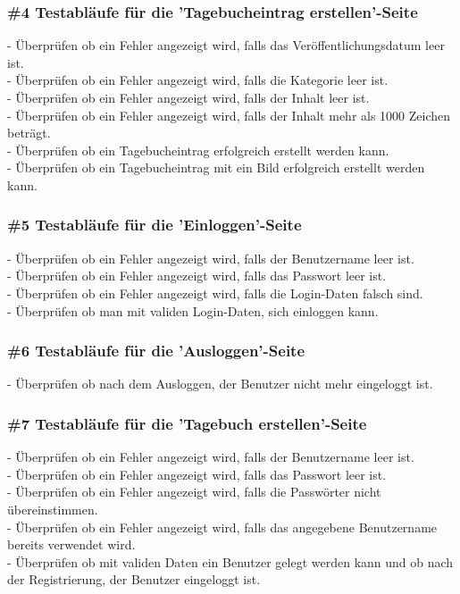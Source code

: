 \subsubsection*{\#4 Testabläufe für die 'Tagebucheintrag erstellen'-Seite}
- Überprüfen ob ein Fehler angezeigt wird, falls das Veröffentlichungsdatum leer ist.\\
- Überprüfen ob ein Fehler angezeigt wird, falls die Kategorie leer ist.\\
- Überprüfen ob ein Fehler angezeigt wird, falls der Inhalt leer ist.\\
- Überprüfen ob ein Fehler angezeigt wird, falls der Inhalt mehr als 1000 Zeichen beträgt.\\
- Überprüfen ob ein Tagebucheintrag erfolgreich erstellt werden kann.\\
- Überprüfen ob ein Tagebucheintrag mit ein Bild erfolgreich erstellt werden kann.

\subsubsection*{\#5 Testabläufe für die 'Einloggen'-Seite}
- Überprüfen ob ein Fehler angezeigt wird, falls der Benutzername leer ist.\\
- Überprüfen ob ein Fehler angezeigt wird, falls das Passwort leer ist.\\
- Überprüfen ob ein Fehler angezeigt wird, falls die Login-Daten falsch sind.\\
- Überprüfen ob man mit validen Login-Daten, sich einloggen kann.

\subsubsection*{\#6 Testabläufe für die 'Ausloggen'-Seite}
- Überprüfen ob nach dem Ausloggen, der Benutzer nicht mehr eingeloggt ist.

\subsubsection*{\#7 Testabläufe für die 'Tagebuch erstellen'-Seite}
- Überprüfen ob ein Fehler angezeigt wird, falls der Benutzername leer ist.\\
- Überprüfen ob ein Fehler angezeigt wird, falls das Passwort leer ist.\\
- Überprüfen ob ein Fehler angezeigt wird, falls die Passwörter nicht übereinstimmen.\\
- Überprüfen ob ein Fehler angezeigt wird, falls das angegebene Benutzername bereits verwendet wird.\\
- Überprüfen ob mit validen Daten ein Benutzer gelegt werden kann und ob nach der Registrierung, der Benutzer eingeloggt ist.

